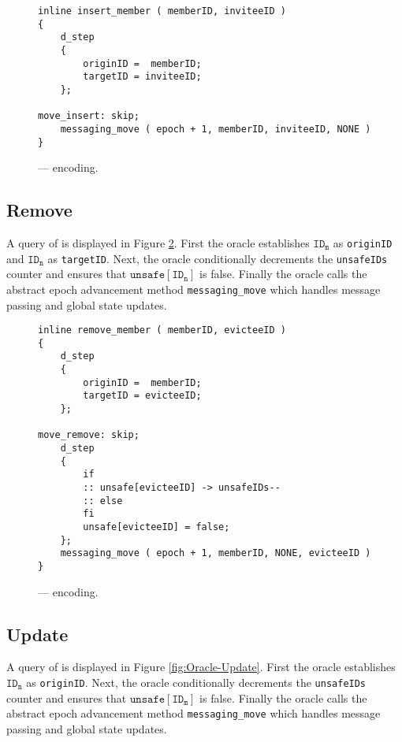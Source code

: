\begin{figure}[h!]
  \centering
  \caption{\label{fig:Oracle-Insert}\CGKAmod{}{}{} ---  encoding.}
\begin{verbatim}
inline insert_member ( memberID, inviteeID )
{
    d_step
    {
        originID =  memberID;
        targetID = inviteeID;
    };

move_insert: skip;
    messaging_move ( epoch + 1, memberID, inviteeID, NONE )
}
\end{verbatim}
\end{figure}


\hypertarget{remove}{%
\subsection{Remove}\label{remove}}

A query of  is displayed in Figure \ref{fig:Oracle-Remove}.
First the oracle establishes \(\mathtt{ID_m}\) as \texttt{originID} and \(\mathtt{ID_n}\) as \texttt{targetID}.
Next, the oracle conditionally decrements the \texttt{unsafeIDs} counter and ensures that \(\mathtt{unsafe[ID_n]}\) is false.
Finally the oracle calls the abstract epoch advancement method \texttt{messaging\_move} which handles message passing and global state updates.

\begin{figure}[h!]
  \centering
  \caption{\label{fig:Oracle-Remove}\CGKAmod{}{}{} ---  encoding.}
\begin{verbatim}
inline remove_member ( memberID, evicteeID )
{
    d_step
    {
        originID =  memberID;
        targetID = evicteeID;
    };

move_remove: skip;
    d_step
    {
        if
        :: unsafe[evicteeID] -> unsafeIDs--
        :: else
        fi
        unsafe[evicteeID] = false;
    };
    messaging_move ( epoch + 1, memberID, NONE, evicteeID )
}
\end{verbatim}
\end{figure}


\hypertarget{update}{%
\subsection{Update}\label{update}}

A query of  is displayed in Figure \ref{fig:Oracle-Update}.
First the oracle establishes \(\mathtt{ID_n}\) as \texttt{originID}.
Next, the oracle conditionally decrements the \texttt{unsafeIDs} counter and ensures that \(\mathtt{unsafe[ID_m]}\) is false.
Finally the oracle calls the abstract epoch advancement method \texttt{messaging\_move} which handles message passing and global state updates.

